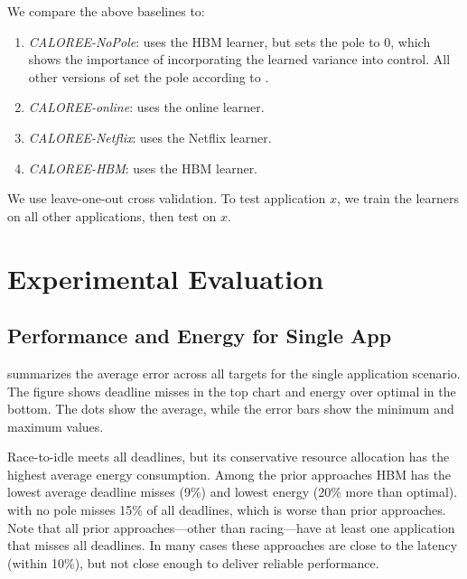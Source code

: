 We compare the above baselines to:
\begin{enumerate}[leftmargin=1em]
\item \textit{CALOREE-NoPole}: uses the HBM learner, but sets the pole
  to 0, which shows the importance of incorporating the learned
  variance into control. All other versions of \SYSTEM{} set the pole
  according to .
\item \textit{CALOREE-online}: uses the online learner.
\item \textit{CALOREE-Netflix}: uses the Netflix learner.
\item \textit{CALOREE-HBM}: uses the HBM learner.
\end{enumerate}We use leave-one-out cross validation. To test
application $x$, we train the learners on all other applications, 
then test on $x$.



\section{Experimental Evaluation}


\subsection{Performance and Energy for Single App}

 summarizes the average error across all
targets for the single application scenario. The figure shows deadline
misses in the top chart and energy over optimal in the bottom.  The
dots show the average, while the error bars show the minimum and
maximum values.

Race-to-idle meets all deadlines, but its conservative resource
allocation has the highest average energy consumption. Among the prior
approaches HBM has the lowest average deadline misses (9\%) and lowest
energy (20\% more than optimal). \SYSTEM{} with no pole misses 15\% of
all deadlines, which is worse than prior approaches. Note that all
prior approaches---other than racing---have at least one application
that misses all deadlines. In many cases these approaches are close to
the latency (within 10\%), but not close enough to deliver reliable
performance.


